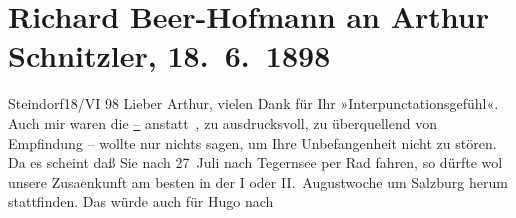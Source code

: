 

         
         \renewcommand{\erwaehntePersonen}{Personen:  ?? [Schauspieler], Mirjam Beer-Hofmann, Paula Beer-Hofmann, Alois Hofmann, Hugo von Hofmannsthal, Ernst Mach}
         \renewcommand{\erwaehnteOrte}{Orte: Salzburg, Steindorf am Ossiacher See, Tegernsee, Valle d’Ampezzo, Wien}
         \renewcommand{\erwaehnteWerke}{Werke: Populär-Wissenschaftliche Vorlesungen, Schlaflied für Mirjam}
               \section[Richard Beer-Hofmann an Arthur Schnitzler, 18. 6. 1898]{ Richard Beer-Hofmann an Arthur Schnitzler, 18. 6. 1898}\nopagebreak{}\rehead{ }\begin{ledgroupsized}[t]{13cm}\normalsize\beginnumbering \toendnotes[C]{\smallbreak\pagebreak[2]} 
\toendnotes[C]{\smallbreak}\pstart
           \raggedleft{}{\pb}Steindorf18/VI 98\pend
           \pstart
           Lieber Arthur, vielen Dank für Ihr »Interpunctationsgefühl«. Auch mir waren die
                  \uline{–} anstatt \uline{,} zu
               ausdrucksvoll, zu überquellend von Empfindung – wollte nur nichts sagen, um Ihre
               Unbefangenheit nicht zu stören.\pend
           \pstart
           Da es scheint daß Sie  nach
                  27 Juli nach Tegernsee per Rad
               fahren, so dürfte wol unsere Zusa{\geminationm}enkunft {\pb}am besten in der I oder
                  II. Augustwoche um Salzburg herum
               stattfinden. Das würde auch für Hugo nach

\end{ledgroupsized}
